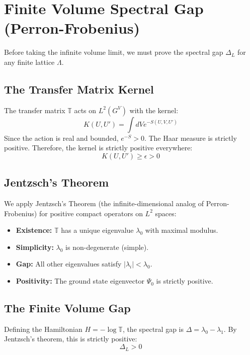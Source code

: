 \section{Finite Volume Spectral Gap (Perron-Frobenius)}
\label{sec:finite_volume_gap}

Before taking the infinite volume limit, we must prove the spectral gap $\Delta_L$ for any finite lattice $\Lambda$.

\subsection{The Transfer Matrix Kernel}
The transfer matrix $\mathbb{T}$ acts on $L^2(G^V)$ with the kernel:
\begin{equation}
K(U, U') = \int dV e^{-S(U, V, U')}
\end{equation}
Since the action is real and bounded, $e^{-S} > 0$. The Haar measure is strictly positive. Therefore, the kernel is strictly positive everywhere:
\begin{equation}
K(U, U') \ge \epsilon > 0
\end{equation}

\subsection{Jentzsch’s Theorem}
We apply Jentzsch’s Theorem (the infinite-dimensional analog of Perron-Frobenius) for positive compact operators on $L^2$ spaces:
\begin{itemize}
\item \textbf{Existence:} $\mathbb{T}$ has a unique eigenvalue $\lambda_0$ with maximal modulus.
\item \textbf{Simplicity:} $\lambda_0$ is non-degenerate (simple).
\item \textbf{Gap:} All other eigenvalues satisfy $|\lambda_i| < \lambda_0$.
\item \textbf{Positivity:} The ground state eigenvector $\Psi_0$ is strictly positive.
\end{itemize}

\subsection{The Finite Volume Gap}
Defining the Hamiltonian $H = -\log \mathbb{T}$, the spectral gap is $\Delta = \lambda_0 - \lambda_1$. By Jentzsch's theorem, this is strictly positive:
\begin{equation}
\Delta_L > 0
\end{equation}

